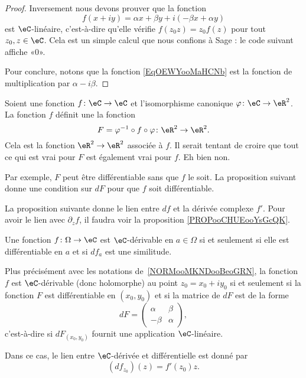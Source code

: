 \begin{proof}
    Inversement nous devons prouver que la fonction
    \begin{equation}        \label{EqOEWYooMaHCNb}
        f(x+iy)=\alpha x+\beta y+i(-\beta x+\alpha y)
    \end{equation}
    est \( \eC\)-linéaire, c'est-à-dire qu'elle vérifie \( f(z_0z)=z_0f(z)\) pour tout \( z_0,z\in \eC\). Cela est un simple calcul que nous confions à Sage : le code suivant affiche «\( 0\)».
    

    Pour conclure, notons que la fonction \eqref{EqOEWYooMaHCNb} est la fonction de multiplication par \( \alpha-i\beta\).
\end{proof}

\begin{normaltext}      \label{NORMooMKNDooBeoGRN}
    Soient une fonction \( f\colon \eC\to \eC\) et l'isomorphisme canonique \( \varphi\colon \eC\to \eR^2\). La fonction \( f\) définit une la fonction
    \begin{equation}
        F=\varphi^{-1} \circ f\circ \varphi\colon \eR^2\to \eR^2.
    \end{equation}
    Cela est la fonction \( \eR^2\to \eR^2\) associée à \( f\). Il serait tentant de croire que tout ce qui est vrai pour \( F\) est également vrai pour \( f\). Eh bien non.

    Par exemple, \( F\) peut être différentiable sans que \( f\) le soit. La proposition suivant donne une condition sur \( dF\) pour que \( f\) soit différentiable.
\end{normaltext}

La proposition suivante donne le lien entre \( df\) et la dérivée complexe \( f'\). Pour avoir le lien avec \( \partial_zf\), il faudra voir la proposition \ref{PROPooCHUEooYsGcQK}.
\begin{proposition}     \label{PropKJUDooJfqgYS}
    Une fonction \( f\colon \Omega\to \eC\) est $\eC$-dérivable en \( a\in\Omega\) si et seulement si elle est différentiable en \( a\) et si \( df_a\) est une similitude.

    Plus précisément avec les notations de~\ref{NORMooMKNDooBeoGRN}, la fonction \( f\) est $\eC$-dérivable (donc holomorphe) au point \( z_0=x_0+iy_0\) si et seulement si la fonction \( F\) est différentiable en \( (x_0,y_0)\) et si la matrice de \( dF\) est de la forme
    \begin{equation}        \label{EQooWZGKooLDEHGr}
        dF=\begin{pmatrix}
            \alpha    &   \beta    \\
            -\beta    &   \alpha
        \end{pmatrix},
    \end{equation}
    c'est-à-dire si \( dF_{(x_0,y_0)}\) fournit une application \( \eC\)-linéaire.

    Dans ce cas, le lien entre \( \eC\)-dérivée et différentielle est donné par
    \begin{equation}        \label{EqPAEFooYNhYpz}
        (df_{z_0})(z)=f'(z_0)z.
    \end{equation}
\end{proposition}

